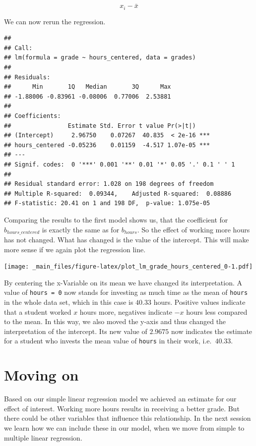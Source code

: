 \documentclass[
]{book}
\begin{document}
\[x_i - \bar{x}\]

We can now rerun the regression.

\begin{verbatim}
## 
## Call:
## lm(formula = grade ~ hours_centered, data = grades)
## 
## Residuals:
##      Min       1Q   Median       3Q      Max 
## -1.88006 -0.83961 -0.08006  0.77006  2.53881 
## 
## Coefficients:
##                Estimate Std. Error t value Pr(>|t|)    
## (Intercept)     2.96750    0.07267  40.835  < 2e-16 ***
## hours_centered -0.05236    0.01159  -4.517 1.07e-05 ***
## ---
## Signif. codes:  0 '***' 0.001 '**' 0.01 '*' 0.05 '.' 0.1 ' ' 1
## 
## Residual standard error: 1.028 on 198 degrees of freedom
## Multiple R-squared:  0.09344,    Adjusted R-squared:  0.08886 
## F-statistic: 20.41 on 1 and 198 DF,  p-value: 1.075e-05
\end{verbatim}

Comparing the results to the first model shows us, that the coefficient for
\(b_{hours\_centered}\) is exactly the same as for \(b_{hours}\). So the effect
of working more hours has not changed. What has changed is the value of the
intercept. This will make more sense if we again plot the regression line.

\texttt{[image: \_main\_files/figure-latex/plot\_lm\_grade\_hours\_centered\_0-1.pdf]}

By centering the x-Variable on its mean we have changed its interpretation.
A value of \texttt{hours\ =\ 0} now stands for investing as much time as the mean
of \texttt{hours} in the whole data set, which in this case is \(40.33\) hours. Positive
values indicate that a student worked \(x\) hours more, negatives indicate \(-x\)
hours less compared to the mean. In this way, we also moved the y-axis and thus
changed the interpretation of the intercept. Its new value of \(2.9675\) now
indicates the estimate for a student who invests the mean value of \texttt{hours} in
their work, i.e.~\(40.33\).

\hypertarget{moving-on-1}{%
\section{Moving on}\label{moving-on-1}}

Based on our simple linear regression model we achieved an estimate for our
effect of interest. Working more hours results in receiving a better grade.
But there could be other variables that influence this relationship. In the
next session we learn how we can include these in our model, when we move from
simple to multiple linear regression.
\end{document}
